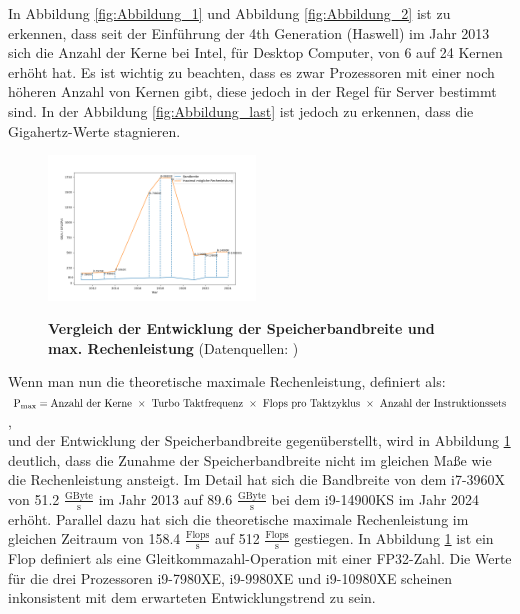 \documentclass[sigconf,language=ngerman]{acmart}
\begin{document}
\setlength{\parindent}{0pt}
    In Abbildung \ref{fig:Abbildung_1} und Abbildung \ref{fig:Abbildung_2} ist zu erkennen, 
    dass seit der Einführung der 4th Generation (Haswell) im Jahr 2013 \cite{intel-4th-gen-core} sich die Anzahl der Kerne bei Intel, 
    für Desktop Computer, von 6 auf 24 Kernen erhöht hat. 
    Es ist wichtig zu beachten, dass es zwar Prozessoren mit einer noch höheren Anzahl von Kernen gibt, 
    diese jedoch in der Regel für Server bestimmt sind.
    In der Abbildung \ref{fig:Abbildung_last} ist jedoch zu erkennen, dass die Gigahertz-Werte stagnieren.
\begin{figure}[ht]
\hspace{-0.6cm}
\caption{\textbf{Vergleich der Entwicklung der Speicherbandbreite und max. Rechenleistung} (Datenquellen: \cite{prozessoren})}
\includegraphics[width=0.49\textwidth]{Abbildung_3.png}
\label{fig:Abbildung_3}
\end{figure}
    Wenn man nun die theoretische maximale Rechenleistung, 
    definiert als:\\ $\textnormal{P}_{\textnormal{max}} = \textnormal{Anzahl der Kerne } \times \textnormal{ Turbo Taktfrequenz } \times \\\textnormal{ Flops pro Taktzyklus } \times \textnormal{ Anzahl der Instruktionssets}$,\\und
    der Entwicklung der Speicherbandbreite gegenüberstellt, wird in Abbildung \ref{fig:Abbildung_3} deutlich, 
    dass die Zunahme der Speicherbandbreite nicht im gleichen Maße wie die Rechenleistung ansteigt. 
    Im Detail hat sich die Bandbreite von dem i7-3960X von 51.2 $\frac{\text{GByte}}{\text{s}}$ im Jahr 2013 auf 89.6 $\frac{\text{GByte}}{\text{s}}$ bei dem i9-14900KS im Jahr 2024 erhöht. 
    Parallel dazu hat sich die theoretische maximale Rechenleistung im gleichen Zeitraum von 158.4 $\frac{\text{Flops}}{\text{s}}$ auf 512 $\frac{\text{Flops}}{\text{s}}$ gestiegen.
    In Abbildung \ref{fig:Abbildung_3} ist ein Flop definiert als eine Gleitkommazahl-Operation mit einer FP32-Zahl.
    Die Werte für die drei Prozessoren i9-7980XE, 
    i9-9980XE und i9-10980XE scheinen inkonsistent mit dem erwarteten Entwicklungstrend zu sein.
\end{document}
